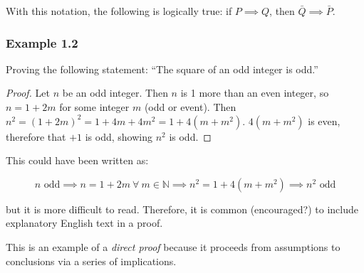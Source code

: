 With this notation, the following is logically true: if $P \implies Q$, then $\bar{Q} \implies \bar{P}$.

\subsubsection*{Example 1.2}

Proving the following statement: ``The square of an odd integer is odd.''

\begin{proof}
    Let $n$ be an odd integer.
    Then $n$ is 1 more than an even integer, so $n = 1 + 2m$ for some integer $m$ (odd or event).
    Then $n^2 = (1+2m)^2 = 1 + 4m +4m^2 = 1 + 4(m + m^2)$.
    $4(m + m^2)$ is even, therefore that $+1$ is odd, showing $n^2$ is odd.
\end{proof}

This could have been written as:

$$
n \text{ odd} \implies n = 1 + 2m\ \forall\ m \in \mathbb{N} \implies n^2 = 1 + 4(m+m^2) \implies n^2 \text{ odd}
$$

\noindent{}but it is more difficult to read.
Therefore, it is common (encouraged?) to include explanatory English text in a proof.

This is an example of a \textit{direct proof} because it proceeds from assumptions to conclusions via a series of implications.

